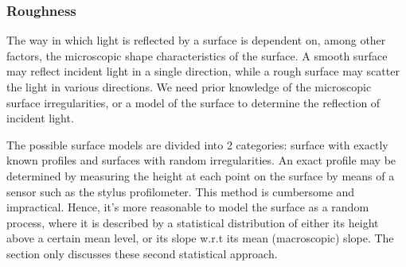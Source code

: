 \subsubsection{Roughness}
The way in which light is reflected by a surface is dependent on, among other factors, the microscopic shape characteristics of the surface. A smooth surface may reflect incident light in a single direction, while a rough surface may scatter the light in various directions. We need prior knowledge of the microscopic surface irregularities, or a model of the surface to determine the reflection of incident light.

The possible surface models are divided into 2 categories: surface with exactly known profiles and surfaces with random irregularities. An exact profile may be determined by measuring the height at each point on the surface by means of a sensor such as the stylus profilometer. This method is cumbersome and impractical. Hence, it’s more reasonable to model the surface as a random process, where it is described by a statistical distribution of either its height above a certain mean level, or its slope w.r.t its mean (macroscopic) slope. The section only discusses these second statistical approach.







